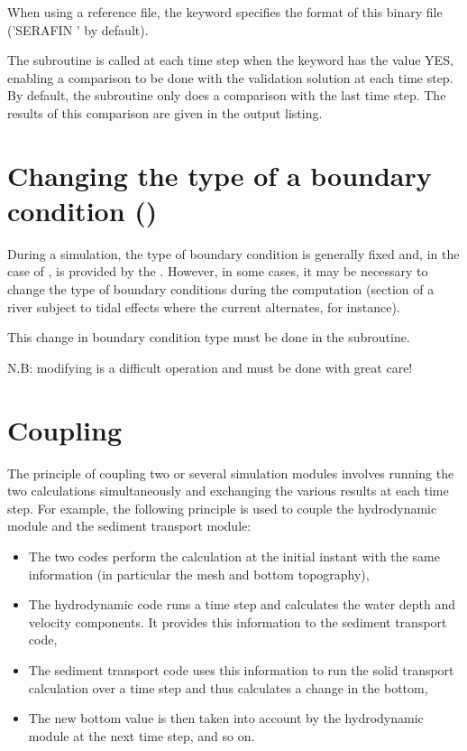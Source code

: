 When using a reference file, the keyword 
specifies the format of this binary file ('SERAFIN ' by default).

The  subroutine is called at each time step
when the keyword  has the value YES,
enabling a comparison to be done with the validation solution at each time step.
By default, the  subroutine only does a comparison
with the last time step.
The results of this comparison are given in the output listing.


\section{Changing the type of a boundary condition ()}
\label{sec:chang:type:bc:propin}
During a simulation, the type of boundary condition is generally fixed and, in
the case of , is provided by the .
However, in some cases, it may be necessary to change the type of boundary
conditions during the computation (section of a river subject to tidal effects
where the current alternates, for instance).

This change in boundary condition type must be done in the
 subroutine.

N.B: modifying  is a difficult operation
and must be done with great care!


\section{Coupling}
\label{sec:coupling}

The principle of coupling two or several simulation modules involves
running the two calculations simultaneously and exchanging the various results
at each time step.
For example, the following principle is used to couple the hydrodynamic module
and the sediment transport module:

\begin{itemize}
\item The two codes perform the calculation at the initial instant
with the same information (in particular the mesh and bottom topography),

\item The hydrodynamic code runs a time step and calculates the water depth
and velocity components.
It provides this information to the sediment transport code,

\item The sediment transport code uses this information to run the solid
transport calculation over a time step and thus calculates a change in the
bottom,

\item The new bottom value is then taken into account by the hydrodynamic module
at the next time step, and so on.
\end{itemize}


